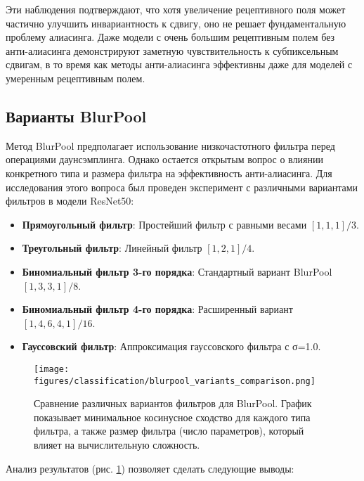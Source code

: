 Эти наблюдения подтверждают, что хотя увеличение рецептивного поля может частично улучшить инвариантность к сдвигу, оно не решает фундаментальную проблему алиасинга. Даже модели с очень большим рецептивным полем без анти-алиасинга демонстрируют заметную чувствительность к субпиксельным сдвигам, в то время как методы анти-алиасинга эффективны даже для моделей с умеренным рецептивным полем.

\subsection{Варианты BlurPool}
\label{experiments:ablation:blurpool_variants}

Метод BlurPool предполагает использование низкочастотного фильтра перед операциями даунсэмплинга. Однако остается открытым вопрос о влиянии конкретного типа и размера фильтра на эффективность анти-алиасинга. Для исследования этого вопроса был проведен эксперимент с различными вариантами фильтров в модели ResNet50:

\begin{itemize}
    \item \textbf{Прямоугольный фильтр}: Простейший фильтр с равными весами $[1, 1, 1]/3$.
    
    \item \textbf{Треугольный фильтр}: Линейный фильтр $[1, 2, 1]/4$.
    
    \item \textbf{Биномиальный фильтр 3-го порядка}: Стандартный вариант BlurPool $[1, 3, 3, 1]/8$.
    
    \item \textbf{Биномиальный фильтр 4-го порядка}: Расширенный вариант $[1, 4, 6, 4, 1]/16$.
    
    \item \textbf{Гауссовский фильтр}: Аппроксимация гауссовского фильтра с σ=1.0.
\end{itemize}

\begin{figure}[ht]
\centering
\texttt{[image: figures/classification/blurpool\_variants\_comparison.png]}
\caption{Сравнение различных вариантов фильтров для BlurPool. График показывает минимальное косинусное сходство для каждого типа фильтра, а также размер фильтра (число параметров), который влияет на вычислительную сложность.}
\label{fig:blurpool_variants}
\end{figure}

Анализ результатов (рис. \ref{fig:blurpool_variants}) позволяет сделать следующие выводы:

